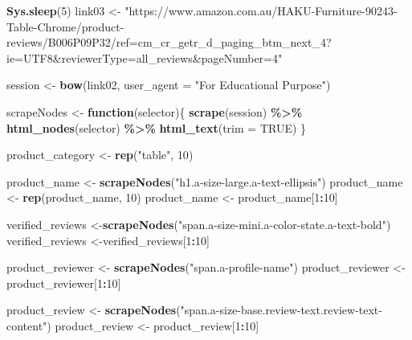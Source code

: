 \documentclass[
]{article}
\newenvironment{Shaded}{\begin{snugshade}}{\end{snugshade}}
\newcommand{\AttributeTok}[1]{\textcolor[rgb]{0.13,0.29,0.53}{#1}}
\newcommand{\ConstantTok}[1]{\textcolor[rgb]{0.56,0.35,0.01}{#1}}
\newcommand{\ControlFlowTok}[1]{\textcolor[rgb]{0.13,0.29,0.53}{\textbf{#1}}}
\newcommand{\DecValTok}[1]{\textcolor[rgb]{0.00,0.00,0.81}{#1}}
\newcommand{\FunctionTok}[1]{\textcolor[rgb]{0.13,0.29,0.53}{\textbf{#1}}}
\newcommand{\NormalTok}[1]{#1}
\newcommand{\OtherTok}[1]{\textcolor[rgb]{0.56,0.35,0.01}{#1}}
\newcommand{\SpecialCharTok}[1]{\textcolor[rgb]{0.81,0.36,0.00}{\textbf{#1}}}
\newcommand{\StringTok}[1]{\textcolor[rgb]{0.31,0.60,0.02}{#1}}
\begin{document}
\begin{Shaded}
\begin{Highlighting}[]
   \FunctionTok{Sys.sleep}\NormalTok{(}\DecValTok{5}\NormalTok{)}
\NormalTok{link03 }\OtherTok{\textless{}{-}} \StringTok{"https://www.amazon.com.au/HAKU{-}Furniture{-}90243{-}Table{-}Chrome/product{-}reviews/B006P09P32/ref=cm\_cr\_getr\_d\_paging\_btm\_next\_4?ie=UTF8\&reviewerType=all\_reviews\&pageNumber=4"}


\NormalTok{  session }\OtherTok{\textless{}{-}} \FunctionTok{bow}\NormalTok{(link02,}
               \AttributeTok{user\_agent =} \StringTok{"For Educational Purpose"}\NormalTok{)}

\NormalTok{  scrapeNodes }\OtherTok{\textless{}{-}} \ControlFlowTok{function}\NormalTok{(selector)\{}
    \FunctionTok{scrape}\NormalTok{(session) }\SpecialCharTok{\%\textgreater{}\%}
      \FunctionTok{html\_nodes}\NormalTok{(selector) }\SpecialCharTok{\%\textgreater{}\%}
      \FunctionTok{html\_text}\NormalTok{(}\AttributeTok{trim =} \ConstantTok{TRUE}\NormalTok{)}
\NormalTok{  \}}

\NormalTok{  product\_category }\OtherTok{\textless{}{-}} \FunctionTok{rep}\NormalTok{(}\StringTok{"table"}\NormalTok{, }\DecValTok{10}\NormalTok{)}

\NormalTok{  product\_name }\OtherTok{\textless{}{-}} \FunctionTok{scrapeNodes}\NormalTok{(}\StringTok{"h1.a{-}size{-}large.a{-}text{-}ellipsis"}\NormalTok{)}
\NormalTok{  product\_name }\OtherTok{\textless{}{-}} \FunctionTok{rep}\NormalTok{(product\_name, }\DecValTok{10}\NormalTok{)}
\NormalTok{  product\_name }\OtherTok{\textless{}{-}}\NormalTok{ product\_name[}\DecValTok{1}\SpecialCharTok{:}\DecValTok{10}\NormalTok{]}
  
\NormalTok{  verified\_reviews }\OtherTok{\textless{}{-}}\FunctionTok{scrapeNodes}\NormalTok{(}\StringTok{"span.a{-}size{-}mini.a{-}color{-}state.a{-}text{-}bold"}\NormalTok{)}
\NormalTok{  verified\_reviews }\OtherTok{\textless{}{-}}\NormalTok{verified\_reviews[}\DecValTok{1}\SpecialCharTok{:}\DecValTok{10}\NormalTok{]}
  
\NormalTok{  product\_reviewer }\OtherTok{\textless{}{-}} \FunctionTok{scrapeNodes}\NormalTok{(}\StringTok{"span.a{-}profile{-}name"}\NormalTok{)}
\NormalTok{  product\_reviewer }\OtherTok{\textless{}{-}}\NormalTok{ product\_reviewer[}\DecValTok{1}\SpecialCharTok{:}\DecValTok{10}\NormalTok{]}
  
\NormalTok{  product\_review }\OtherTok{\textless{}{-}} \FunctionTok{scrapeNodes}\NormalTok{(}\StringTok{"span.a{-}size{-}base.review{-}text.review{-}text{-}content"}\NormalTok{)}
\NormalTok{  product\_review }\OtherTok{\textless{}{-}}\NormalTok{ product\_review[}\DecValTok{1}\SpecialCharTok{:}\DecValTok{10}\NormalTok{]}
  

\end{Highlighting}
\end{Shaded}
\end{document}
